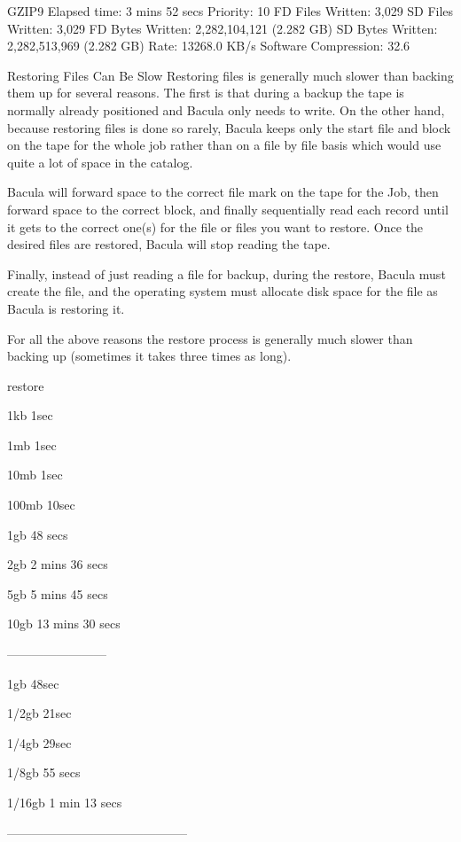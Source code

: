 GZIP9
  Elapsed time:           3 mins 52 secs
  Priority:               10
  FD Files Written:       3,029
  SD Files Written:       3,029
  FD Bytes Written:       2,282,104,121 (2.282 GB)
  SD Bytes Written:       2,282,513,969 (2.282 GB)
  Rate:                   13268.0 KB/s
  Software Compression:   32.6%



Restoring Files Can Be Slow
Restoring files is generally much slower than backing them up for several reasons. The first is that during a backup the tape is normally already positioned and Bacula only needs to write. On the other hand, because restoring files is done so rarely, Bacula keeps only the start file and block on the tape for the whole job rather than on a file by file basis which would use quite a lot of space in the catalog.

Bacula will forward space to the correct file mark on the tape for the Job, then forward space to the correct block, and finally sequentially read each record until it gets to the correct one(s) for the file or files you want to restore. Once the desired files are restored, Bacula will stop reading the tape.

Finally, instead of just reading a file for backup, during the restore, Bacula must create the file, and the operating system must allocate disk space for the file as Bacula is restoring it.

For all the above reasons the restore process is generally much slower than backing up (sometimes it takes three times as long).

restore

1kb 1sec

1mb 1sec

10mb 1sec

100mb 10sec 

1gb 48 secs

2gb 2 mins 36 secs

5gb 5 mins 45 secs

10gb  13 mins 30 secs

------------------------

1gb 48sec

1/2gb  21sec 

1/4gb  29sec

1/8gb  55 secs
 
1/16gb 1 min 13 secs


--------------------------------------------


